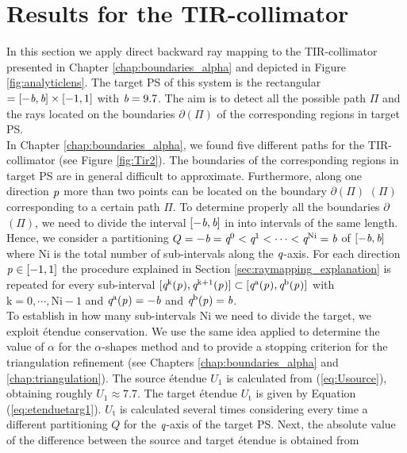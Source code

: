 \section{Results for the TIR-collimator}\label{sec:TIR}
In this section we apply direct backward ray mapping to the TIR-collimator presented in Chapter \ref{chap:boundaries_alpha} and depicted in Figure \ref{fig:analyticlens}. The target PS of this system is the rectangular $= [-\textit{b}, \textit{b}]\times[-1,1]$ with $\textit{b}=9.7$. The aim is to detect all the possible path $\Pi$ and the rays located on the boundaries $\partial$$(\Pi)$ of the corresponding regions in target PS. 
\\ \indent In Chapter \ref{chap:boundaries_alpha}, we found five different paths for the TIR-collimator (see Figure \ref{fig:Tir2}). The boundaries of the corresponding regions in target PS  are in general difficult to approximate. Furthermore, along one direction $\textit{p}_{\textrm{} \textit{}}$ more than two points can be located on the boundary $\partial$$(\Pi)$ $(\Pi)$ corresponding to a certain path $\Pi$. To determine properly all the boundaries 
$\partial$$(\Pi)$, we need to divide the interval $[-\textit{b}, \textit{b}]$ in 
 into intervals of the same length. Hence, we consider a partitioning 
$Q = -\textit{b}=\textit{q}^{0}<\textit{q}^{1}<\cdots<\textit{q}^{\textrm{Ni}}=\textit{b}$ of $[-\textit{b}, \textit{b}]$ where $\textrm{Ni}$ is the total number of sub-intervals along the $\textit{q}$-axis.
For each direction $\textit{p}_{\textrm{} \textit{}}\in [-1,1]$ the procedure explained in Section \ref{sec:raymapping_explanation} is repeated for every sub-interval $[\textit{q}^{\textrm{k}}(\textit{p}_{\textrm{} \textit{}}), \textit{q}^{\textrm{k}+1}(\textit{p}_{\textrm{} \textit{}})]\subset [\textit{q}^{\textrm{a}}(\textit{p}_{\textrm{} \textit{}}), \textit{q}^{\textrm{b}}(\textit{p}_{\textrm{} \textit{}})]$ with $\textrm{k}=0, \cdots, \textrm{Ni}-1$ and $\textit{q}^{\textrm{a}}(\textit{p}_{\textrm{} \textit{}}) = -\textit{b}$ and $\textit{q}^{\textrm{b}}(\textit{p}_{\textrm{} \textit{}}) = \textit{b}$.\\ \indent
To establish in how many sub-intervals \textrm{Ni} we need to divide the target, we exploit \'{e}tendue conservation. We use the same idea applied to determine the value of $\alpha$ for the $\alpha$-shapes method and to provide a stopping criterion for the triangulation refinement (see Chapters \ref{chap:boundaries_alpha} and \ref{chap:triangulation}). 
The source \'{e}tendue $U_1$ is calculated from (\ref{eq:Usource}), obtaining roughly $U_1 \approx 7.7$. The target \'{e}tendue $U_\textrm{t}$ is given by Equation (\ref{eq:etenduetarg1}). $U_\textrm{t}$ is calculated several times considering every time a different partitioning $Q$ for the $\textit{q}$-axis of the target PS. Next, the absolute value of the difference between the source and target \'{e}tendue is obtained from
